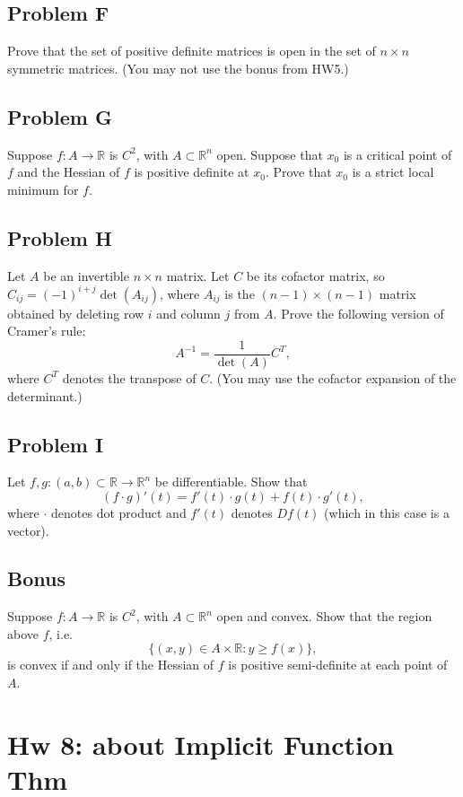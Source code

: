\documentclass[lang=cn,11pt]{template}
\begin{document}
\section*{Problem F}
Prove that the set of positive definite matrices is open in the set of $n \times n$ symmetric matrices. (You may not use the bonus from HW5.)

\section*{Problem G}
Suppose $f : A \to \mathbb{R}$ is $C^2$, with $A \subset \mathbb{R}^n$ open. Suppose that $x_0$ is a critical point of $f$ and the Hessian of $f$ is positive definite at $x_0$. Prove that $x_0$ is a strict local minimum for $f$.

\section*{Problem H}
Let $A$ be an invertible $n \times n$ matrix. Let $C$ be its cofactor matrix, so $C_{ij} = (-1)^{i+j} \det(A_{ij})$, where $A_{ij}$ is the $(n-1) \times (n-1)$ matrix obtained by deleting row $i$ and column $j$ from $A$. Prove the following version of Cramer's rule:
\[
A^{-1} = \frac{1}{\det(A)} C^T,
\]
where $C^T$ denotes the transpose of $C$. (You may use the cofactor expansion of the determinant.)

\section*{Problem I}
Let $f, g : (a, b) \subset \mathbb{R} \to \mathbb{R}^n$ be differentiable. Show that
\[
(f \cdot g)'(t) = f'(t) \cdot g(t) + f(t) \cdot g'(t),
\]
where $\cdot$ denotes dot product and $f'(t)$ denotes $Df(t)$ (which in this case is a vector).

\section*{Bonus}
Suppose $f : A \to \mathbb{R}$ is $C^2$, with $A \subset \mathbb{R}^n$ open and convex. Show that the region above $f$, i.e.
\[
\{(x, y) \in A \times \mathbb{R} : y \geq f(x)\},
\]
is convex if and only if the Hessian of $f$ is positive semi-definite at each point of $A$.




\chapter*{Hw 8: about Implicit Function Thm}
\end{document}
